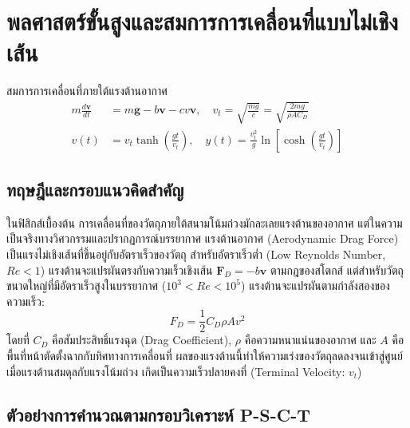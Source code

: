 
\chapter{พลศาสตร์ขั้นสูงและสมการการเคลื่อนที่แบบไม่เชิงเส้น}
\label{ch:chapter02}


\vspace{0.4cm}

\begin{equationsbox}{สมการการเคลื่อนที่ภายใต้แรงต้านอากาศ}
\begin{align}
m\frac{d\mathbf{v}}{dt} &= m\mathbf{g} - b\mathbf{v} - c v \mathbf{v}, \quad v_t = \sqrt{\frac{mg}{c}} = \sqrt{\frac{2mg}{\rho A C_D}} \\
v(t) &= v_t \tanh\left(\frac{gt}{v_t}\right), \quad y(t) = \frac{v_t^2}{g}\ln\left[\cosh\left(\frac{gt}{v_t}\right)\right]
\end{align}
\end{equationsbox}

\section{ทฤษฎีและกรอบแนวคิดสำคัญ}

ในฟิสิกส์เบื้องต้น การเคลื่อนที่ของวัตถุภายใต้สนามโน้มถ่วงมักละเลยแรงต้านของอากาศ แต่ในความเป็นจริงทางวิศวกรรมและปรากฏการณ์บรรยากาศ แรงต้านอากาศ (Aerodynamic Drag Force) เป็นแรงไม่เชิงเส้นที่ขึ้นอยู่กับอัตราเร็วของวัตถุ สำหรับอัตราเร็วต่ำ (Low Reynolds Number, $Re < 1$) แรงต้านจะแปรผันตรงกับความเร็วเชิงเส้น $\mathbf{F}_D = -b\mathbf{v}$ ตามกฎของสโตกส์ แต่สำหรับวัตถุขนาดใหญ่ที่มีอัตราเร็วสูงในบรรยากาศ ($10^3 < Re < 10^5$) แรงต้านจะแปรผันตามกำลังสองของความเร็ว:
\begin{equation}
F_D = \frac{1}{2} C_D \rho A v^2
\end{equation}
โดยที่ $C_D$ คือสัมประสิทธิ์แรงฉุด (Drag Coefficient), $\rho$ คือความหนาแน่นของอากาศ และ $A$ คือพื้นที่หน้าตัดตั้งฉากกับทิศทางการเคลื่อนที่ ผลของแรงต้านนี้ทำให้ความเร่งของวัตถุลดลงจนเข้าสู่ศูนย์เมื่อแรงต้านสมดุลกับแรงโน้มถ่วง เกิดเป็นความเร็วปลายคงที่ (Terminal Velocity: $v_t$)

\section{ตัวอย่างการคำนวณตามกรอบวิเคราะห์ P-S-C-T}

